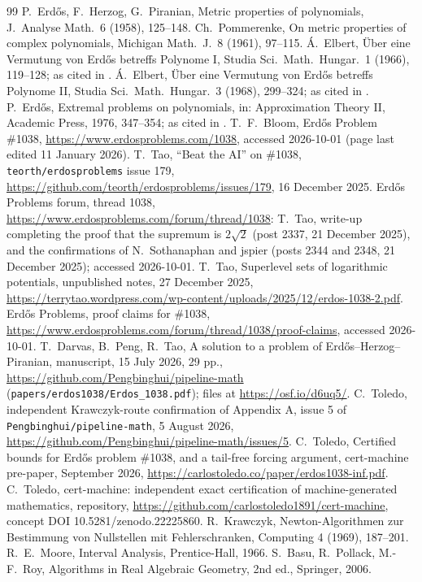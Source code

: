 \documentclass[11pt]{article}
\begin{document}
\begin{thebibliography}{99}
 P.~Erd\H{o}s, F.~Herzog, G.~Piranian, Metric properties of polynomials, J.\ Analyse Math.\ 6 (1958), 125--148.
 Ch.~Pommerenke, On metric properties of complex polynomials, Michigan Math.\ J.\ 8 (1961), 97--115.
 \'A.~Elbert, \"Uber eine Vermutung von Erd\H{o}s betreffs Polynome I, Studia Sci.\ Math.\ Hungar.\ 1 (1966), 119--128; as cited in \cite{DPT}.
 \'A.~Elbert, \"Uber eine Vermutung von Erd\H{o}s betreffs Polynome II, Studia Sci.\ Math.\ Hungar.\ 3 (1968), 299--324; as cited in \cite{DPT}.
 P.~Erd\H{o}s, Extremal problems on polynomials, in: Approximation Theory II, Academic Press, 1976, 347--354; as cited in \cite{DPT}.
 T.~F.~Bloom, Erd\H{o}s Problem \#1038, \url{https://www.erdosproblems.com/1038}, accessed 2026-10-01 (page last edited 11 January 2026).
 T.~Tao, ``Beat the AI'' on \#1038, \texttt{teorth/erdosproblems} issue 179, \url{https://github.com/teorth/erdosproblems/issues/179}, 16 December 2025.
 Erd\H{o}s Problems forum, thread 1038, \url{https://www.erdosproblems.com/forum/thread/1038}: T.~Tao, write-up completing the proof that the supremum is $2\sqrt2$ (post 2337, 21 December 2025), and the confirmations of N.~Sothanaphan and jspier (posts 2344 and 2348, 21 December 2025); accessed 2026-10-01.
 T.~Tao, Superlevel sets of logarithmic potentials, unpublished notes, 27 December 2025, \url{https://terrytao.wordpress.com/wp-content/uploads/2025/12/erdos-1038-2.pdf}.
 Erd\H{o}s Problems, proof claims for \#1038, \url{https://www.erdosproblems.com/forum/thread/1038/proof-claims}, accessed 2026-10-01.
 T.~Darvas, B.~Peng, R.~Tao, A solution to a problem of Erd\H{o}s--Herzog--Piranian, manuscript, 15 July 2026, 29 pp., \url{https://github.com/Pengbinghui/pipeline-math} (\texttt{papers/erdos1038/Erdos\_1038.pdf}); files at \url{https://osf.io/d6uq5/}.
 C.~Toledo, independent Krawczyk-route confirmation of Appendix A, issue 5 of \texttt{Pengbinghui/pipeline-math}, 5 August 2026, \url{https://github.com/Pengbinghui/pipeline-math/issues/5}.
 C.~Toledo, Certified bounds for Erd\H{o}s problem \#1038, and a tail-free forcing argument, cert-machine pre-paper, September 2026, \url{https://carlostoledo.co/paper/erdos1038-inf.pdf}.
 C.~Toledo, cert-machine: independent exact certification of machine-generated mathematics, repository, \url{https://github.com/carlostoledo1891/cert-machine}, concept DOI 10.5281/zenodo.22225860.
 R.~Krawczyk, Newton-Algorithmen zur Bestimmung von Nullstellen mit Fehlerschranken, Computing 4 (1969), 187--201.
 R.~E.~Moore, Interval Analysis, Prentice-Hall, 1966.
 S.~Basu, R.~Pollack, M.-F.~Roy, Algorithms in Real Algebraic Geometry, 2nd ed., Springer, 2006.
\end{thebibliography}
\end{document}
